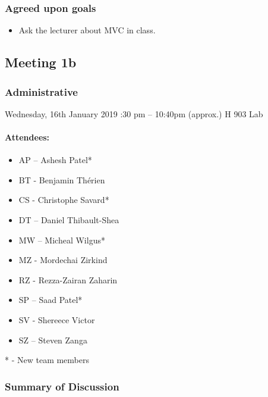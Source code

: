 \documentclass[10pt, a4paper]{article}
\begin{document}
			\subsubsection{Agreed upon goals}
			\begin{itemize}
				\item Ask the lecturer about MVC in class. 
			\end{itemize}
			
			\pagebreak
			
			\subsection{Meeting 1b}
			
			\subsubsection{Administrative}
			Wednesday, 16th January 2019 :30 pm – 10:40pm (approx.) \textbar H 903 Lab
			\paragraph{Attendees:} 
			\begin{itemize}
				\item AP – Ashesh Patel*
				\item BT - Benjamin Th\'erien
				\item CS - Christophe Savard*
				\item DT – Daniel Thibault-Shea
				\item MW – Micheal Wilgus*  
				\item MZ - Mordechai Zirkind 
				\item RZ - Rezza-Zairan Zaharin
				\item SP – Saad Patel* 	
				\item SV - Shereece Victor
				\item SZ – Steven Zanga
			\end{itemize}
			* - New team members 
			
			
			\subsubsection{Summary of Discussion }
\end{document}
